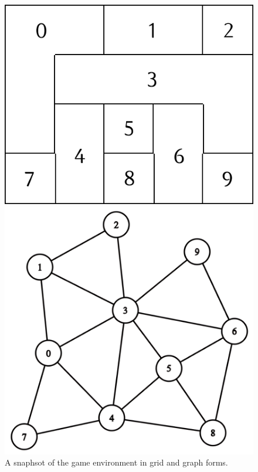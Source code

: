     \begin{figure}[h]
        \centering
        \begin{minipage}{0.46\linewidth}
            \centering
            \includegraphics[width=\linewidth]{images/grid.png}
        \end{minipage}
        \hfill
        \begin{minipage}{0.49\linewidth}
            \centering
            \includegraphics[width=\linewidth]{images/graph.png}
        \end{minipage}
        \caption{A snaphsot of the game environment in grid and graph forms.}
        \label{fig:grid_and_graph}
    \end{figure}

